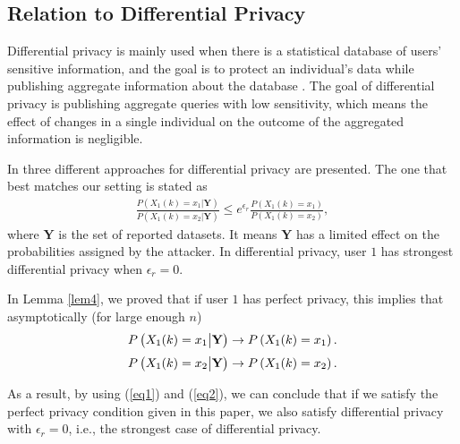 

\subsection{Relation to Differential Privacy}
Differential privacy is mainly used when there is a statistical database of users' sensitive information, and the goal is to protect an individual's data while publishing aggregate information about the database \cite{ lee2012differential, bordenabe2014optimal, chatzikokolakis2015geo, nguyen2013differential, machanavajjhala2008privacy, kousha2}. The goal of differential privacy is publishing aggregate queries with low sensitivity, which means the effect of changes in a single individual on the outcome of the aggregated information is negligible.

In \cite{geo2013} three different approaches for differential privacy are presented. The one that best matches our setting is stated as
\begin{align*}
\frac{P(X_1(k)=x_1|\textbf{Y})}{P(X_1(k)=x_2|\textbf{Y})} \leq e^{\epsilon_r}\frac{P(X_1(k)=x_1)}{P(X_1(k)=x_2)},
\end{align*}
where $\textbf{Y}$ is the set of reported datasets.
It means $\textbf{Y}$ has a limited effect on the probabilities assigned by the attacker. In differential privacy, user $1$ has strongest differential privacy when $\epsilon_r=0$.

In Lemma \ref{lem4}, we proved that if user $1$ has perfect privacy, this implies that asymptotically (for large enough $n$)
\begin{align}\label{eq1}
P\left(X_1(k)=x_1 \big{|} \textbf{Y}\right)\rightarrow P\left(X_1(k)=x_1\right).
\end{align}
\begin{align}\label{eq2}
P\left(X_1(k)=x_2 \big{|} \textbf{Y}\right)\rightarrow P\left(X_1(k)=x_2\right).
\end{align}

As a result, by using (\ref{eq1}) and (\ref{eq2}), we can conclude that if we satisfy the perfect privacy condition given in this paper, we also satisfy differential privacy with $\epsilon_r=0$, i.e., the strongest case of differential privacy.




